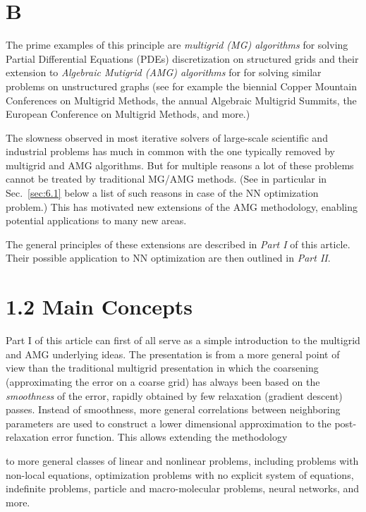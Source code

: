 \documentclass{article} %
\begin{document}
\section{B}
The prime examples of this principle are {\it multigrid (MG) algorithms} for solving Partial Differential Equations (PDEs) discretization on structured grids \cite{?} and their extension to {\it Algebraic Mutigrid (AMG) algorithms} for for solving similar problems on unstructured graphs (see for example the biennial Copper Mountain Conferences on Multigrid Methods, the annual Algebraic Multigrid Summits, the European Conference on Multigrid Methods, and more.)

The slowness observed in most iterative solvers of large-scale scientific and industrial problems has much in common with the one typically removed by multigrid and AMG algorithms. But for multiple reasons a lot of these problems cannot be treated by traditional MG/AMG methods. (See in particular in Sec.~\ref{sec:6.1} below a list of such reasons in case of the NN optimization problem.) This has motivated new extensions of the AMG methodology, enabling potential applications to many new areas.

The general principles of these extensions are described in {\it Part I} of this article. Their possible application to NN optimization are then outlined in {\it Part II}.

\section{1.2 Main Concepts}
Part I of this article can first of all serve as a simple introduction to the multigrid and AMG underlying ideas. The presentation is from a more general point of view than the traditional multigrid presentation in which the coarsening (approximating the error on a coarse grid) has always been based on the {\it smoothness} of the error, rapidly obtained by few relaxation (gradient descent) passes. Instead of smoothness, more general correlations between neighboring parameters are used to construct a lower dimensional approximation to the post-relaxation error function. This allows extending the methodology

to more general classes of linear and nonlinear problems, including problems with non-local equations, optimization problems with no explicit system of equations, indefinite problems, particle and macro-molecular problems, neural networks, and more.
\end{document}
